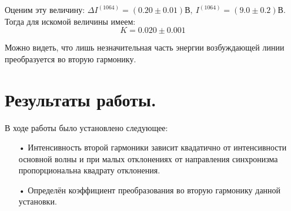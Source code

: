 \documentclass[12pt]{article}
\begin{document}
Оценим эту величину: $\Delta I^{(1064)} = (0.20\pm 0.01)\text{В},\ I^{(1064)} = (9.0\pm 0.2)\text{В}$. Тогда для искомой величины имеем:
\begin{equation}
K = 0.020 \pm 0.001
\end{equation}

Можно видеть, что лишь незначительная часть энергии возбуждающей линии преобразуется во вторую гармонику.

\section{Результаты работы.}

\hspace{0.5cm}
В ходе работы было установлено следующее:
\begin{itemize}
\item[•] Интенсивность второй гармоники зависит квадатично от интенсивности основной волны и при малых отклонениях от направления синхронизма пропорциональна квадрату отклонения.
\item[•] Определён коэффициент преобразования во вторую гармонику данной установки.
\end{itemize}


\end{document}

